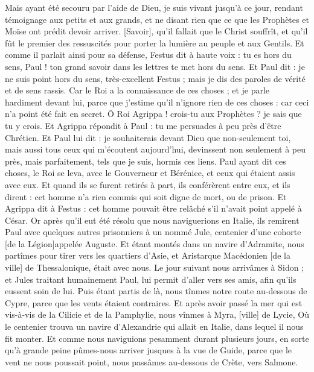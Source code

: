 \begin{multicols}{2}
Mais ayant été secouru par l'aide de Dieu, je suis vivant jusqu'à ce jour, rendant témoignage aux petits et aux grands, et ne disant rien que ce que les Prophètes et Moïse ont prédit devoir arriver.
[Savoir], qu'il fallait que le Christ souffrît, et qu'il fût le premier des ressuscités pour porter la lumière au peuple et aux Gentils.
Et comme il parlait ainsi pour sa défense, Festus dit à haute voix : tu es hors du sens, Paul ! ton grand savoir dans les lettres te met hors du sens.
Et Paul dit : je ne suis point hors du sens, très-excellent Festus ; mais je dis des paroles de vérité et de sens rassis.
Car le Roi a la connaissance de ces choses ; et je parle hardiment devant lui, parce que j'estime qu'il n'ignore rien de ces choses : car ceci n'a point été fait en secret.
Ô Roi Agrippa ! crois-tu aux Prophètes ? je sais que tu y crois.
Et Agrippa répondit à Paul : tu me persuades à peu près d'être Chrétien.
Et Paul lui dit : je souhaiterais devant Dieu que non-seulement toi, mais aussi tous ceux qui m'écoutent aujourd'hui, devinssent non seulement à peu près, mais parfaitement, tels que je suis, hormis ces liens.
Paul ayant dit ces choses, le Roi se leva, avec le Gouverneur et Bérénice, et ceux qui étaient assis avec eux.
Et quand ils se furent retirés à part, ils conférèrent entre eux, et ils dirent : cet homme n'a rien commis qui soit digne de mort, ou de prison.
Et Agrippa dit à Festus : cet homme pouvait être relâché s'il n'avait point appelé à César.
\VerseOne{}Or après qu'il eut été résolu que nous naviguerions en Italie, ils remirent Paul avec quelques autres prisonniers à un nommé Jule, centenier d'une cohorte [de la Légion]appelée Auguste.
Et étant montés dans un navire d'Adramite, nous partîmes pour tirer vers les quartiers d'Asie, et Aristarque Macédonien [de la ville] de Thessalonique, était avec nous.
Le jour suivant nous arrivâmes à Sidon ; et Jules traitant humainement Paul, lui permit d'aller vers ses amis, afin qu'ils eussent soin de lui.
Puis étant partis de là, nous tînmes notre route au-dessous de Cypre, parce que les vents étaient contraires.
Et après avoir passé la mer qui est vis-à-vis de la Cilicie et de la Pamphylie, nous vînmes à Myra, [ville] de Lycie,
Où le centenier trouva un navire d'Alexandrie qui allait en Italie, dans lequel il nous fit monter.
Et comme nous naviguions pesamment durant plusieurs jours, en sorte qu'à grande peine pûmes-nous arriver jusques à la vue de Guide, parce que le vent ne nous poussait point, nous passâmes au-dessous de Crète, vers Salmone.

\end{multicols}
